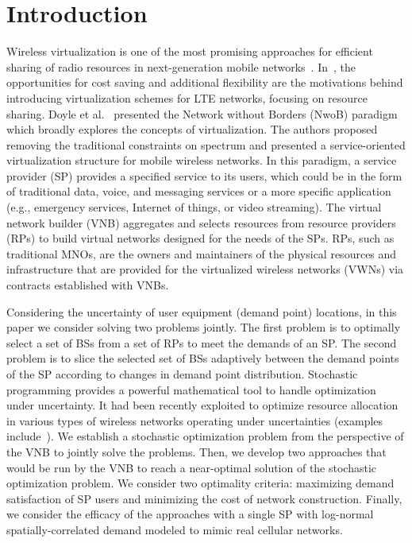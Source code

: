 \documentclass[conference]{IEEEtran}
\begin{document}
\IEEEpeerreviewmaketitle



\section{Introduction} \label{sec:intro}

Wireless virtualization is one of the most promising approaches for efficient sharing of radio resources in next-generation mobile networks~\cite{6824752}.  In~\cite{6553675, 6571315}, the opportunities for cost saving and additional flexibility are the motivations behind introducing virtualization schemes for LTE networks, focusing on resource sharing.  Doyle et al.~\cite{6737248} presented the Network without Borders (NwoB) paradigm which broadly explores the concepts of virtualization.  The authors proposed removing the traditional constraints on spectrum and presented a service-oriented virtualization structure for mobile wireless networks.  In this paradigm, a service provider (SP) provides a specified service to its users, which could be in the form of traditional data, voice, and messaging services or a more specific application (e.g., emergency services, Internet of things, or video streaming).  The virtual network builder (VNB) aggregates and selects resources from resource providers (RPs) to build virtual networks designed for the needs of the SPs.  RPs, such as traditional MNOs, are the owners and maintainers of the physical resources and infrastructure that are provided for the virtualized wireless networks (VWNs) via contracts established with VNBs.

Considering the uncertainty of user equipment (demand point) locations, in this paper we consider solving two problems jointly.  The first problem is to optimally select a set of BSs from a set of RPs to meet the demands of an SP.  The second problem is to slice the selected set of BSs adaptively between the demand points of the SP according to changes in demand point distribution.  Stochastic programming provides a powerful mathematical tool to handle optimization under uncertainty.  It had been recently exploited to optimize resource allocation in various types of wireless networks operating under uncertainties (examples include~\cite{MJ_TW_13, CC_OFDMA, MJ_MECOMM_17, MJ_CCNC_16, MJ_WCNC_16, MJ_DySPAN_15, CC_video}).  We establish a stochastic optimization problem from the perspective of the VNB to jointly solve the problems.  Then, we develop two approaches that would be run by the VNB to reach a near-optimal solution of the stochastic optimization problem.  We consider two optimality criteria: maximizing demand satisfaction of SP users and minimizing the cost of network construction.  Finally, we consider the efficacy of the approaches with a single SP with log-normal spatially-correlated demand modeled to mimic real cellular networks.
\end{document}
